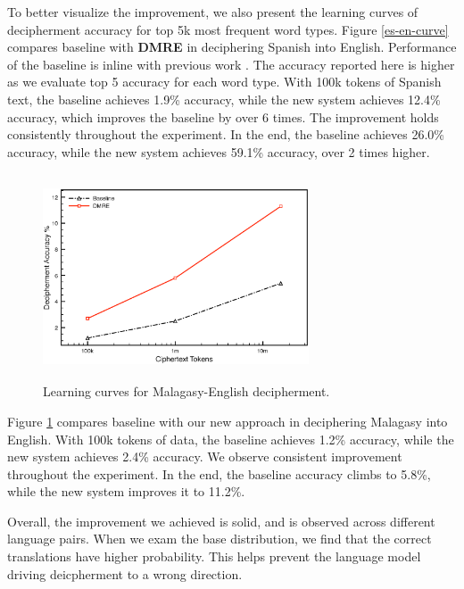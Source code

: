To better visualize the improvement, we also present the learning curves of decipherment accuracy for top 5k most frequent word types. Figure \ref{es-en-curve} compares baseline with \textbf{DMRE} in deciphering Spanish into English. Performance of the baseline is inline with previous work \cite{dou-knight:2013:EMNLP}. The accuracy reported here is higher as we evaluate top 5 accuracy for each word type. With 100k tokens of Spanish text, the baseline achieves 1.9\% accuracy, while the new system achieves 12.4\% accuracy, which improves the baseline by over 6 times. The improvement holds consistently throughout the experiment. In the end, the baseline achieves 26.0\% accuracy, while the new system achieves 59.1\% accuracy, over 2 times higher. 

 \begin{figure}[!ht]
  \centering
  \includegraphics[width=3.1in,height=2.4in]{mlg_en_curve}
  \caption{Learning curves for Malagasy-English decipherment.}
\label{mlg-en-curve}
\end{figure}


Figure \ref{mlg-en-curve} compares baseline with our new approach in deciphering Malagasy into English. With 100k tokens of data, the baseline achieves 1.2\% accuracy, while the new system achieves 2.4\% accuracy.  We observe consistent improvement throughout the experiment. In the end, the baseline accuracy climbs to 5.8\%, while the new system improves it to 11.2\%.

Overall, the improvement we achieved is solid, and is observed across different language pairs. When we exam the base distribution, we find that the correct translations have higher probability. This helps prevent the language model driving deicpherment to a wrong direction. 

 






